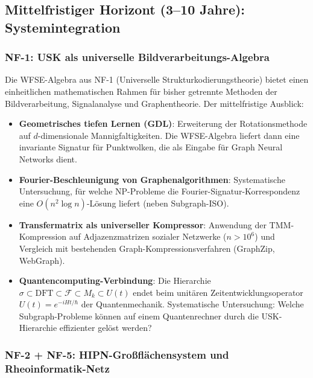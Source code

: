 ﻿\documentclass[a4paper,12pt]{scrreprt}
\theoremstyle{definition}
\begin{document}
\subsection{Mittelfristiger Horizont (3--10 Jahre): Systemintegration}

\subsubsection{NF-1: USK als universelle Bildverarbeitungs-Algebra}

Die WFSE-Algebra aus NF-1 (Universelle Strukturkodierungstheorie) bietet
einen einheitlichen mathematischen Rahmen für bisher getrennte Methoden
der Bildverarbeitung, Signalanalyse und Graphentheorie. Der mittelfristige
Ausblick:
\begin{itemize}
  \item \textbf{Geometrisches tiefen Lernen (GDL)}: Erweiterung der
    Rotationsmethode auf $d$-dimensionale Mannigfaltigkeiten. Die
    WFSE-Algebra liefert dann eine invariante Signatur für Punktwolken,
    die als Eingabe für Graph Neural Networks dient.
  \item \textbf{Fourier-Beschleunigung von Graphenalgorithmen}: Systematische
    Untersuchung, für welche NP-Probleme die Fourier-Signatur-Korrespondenz
    eine $O(n^2 \log n)$-Lösung liefert (neben Subgraph-ISO).
  \item \textbf{Transfermatrix als universeller Kompressor}: Anwendung
    der TMM-Kompression auf Adjazenzmatrizen sozialer Netzwerke
    ($n > 10^6$) und Vergleich mit bestehenden Graph-Kompressionsverfahren
    (GraphZip, WebGraph).
  \item \textbf{Quantencomputing-Verbindung}: Die
    Hierarchie $\sigma \subset \mathrm{DFT} \subset \mathcal{F} \subset
    M_k \subset U(t)$ endet beim unitären Zeitentwicklungsoperator
    $U(t) = e^{-iHt/\hbar}$ der Quantenmechanik. Systematische
    Untersuchung: Welche Subgraph-Probleme können auf einem Quantenrechner
    durch die USK-Hierarchie effizienter gelöst werden?
\end{itemize}

\subsubsection{NF-2 + NF-5: HIPN-Großflächensystem und Rheoinformatik-Netz}
\end{document}
